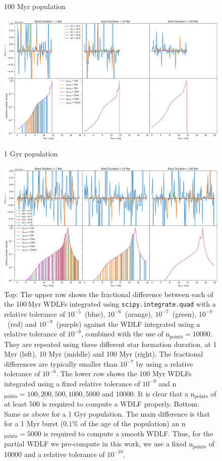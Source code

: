 \documentclass[fleqn,usenatbib]{mnras}
\begin{document}
\begin{figure}
    \centering
    \begin{large}
        100 Myr population
    \end{large}
    \includegraphics[width=0.95\linewidth]{figures/fig_A_age_1000000000.png} \\
    \begin{large}
        1 Gyr population 
    \end{large}
    \includegraphics[width=0.95\linewidth]{figures/fig_A_age_10000000000.png}
    \caption{Top: The upper row shows the fractional difference between each of
    the 100\,Myr WDLFs integrated using \texttt{scipy.integrate.quad} with a
    relative tolerance of $10^{-5}$~(blue), $10^{-6}$~(orange),
    $10^{-7}$~(green), $10^{-8}$~(red) and $10^{-9}$~(purple) against the WDLF
    integrated using a relative tolerance of $10^{-9}$, combined with the use
    of n$_{\mathrm{points}}=10000$. They are repeated using three different
    star formation duration, at 1 Myr (left), 10 Myr (middle) and 100 Myr (right).
    The fractional differences are typically smaller than $10^{-7}$ by using a
    relative tolerance of $10^{-8}$. The lower row shows the 100 Myr WDLFs
    integrated using a fixed relative tolerance of $10^{-9}$ and
    n$_{\mathrm{points}} = 100, 200, 500, 1000, 5000$ and $10000$. It is clear
    that a n$_{\mathrm{points}}$ of at least $500$ is required to compute a
    WDLF properly. Bottom: Same as above for a 1 Gyr population. The main
    difference is that for a 1 Myr burst ($0.1\%$ of the age of the population)
    an n$_{\mathrm{points}}=5000$ is required to compute a smooth WDLF. Thus,
    for the partial WDLF we pre-compute in this work, we use a fixed
    n$_{\mathrm{points}}$ of 10000 and a relative tolerance of $10^{-10}$.}
    \label{fig:integration-precision}
\end{figure}

\bsp	%
\label{lastpage}
\end{document}
